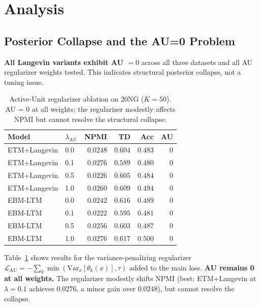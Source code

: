 \documentclass[10pt]{article}
\begin{document}
\section{Analysis}
\label{sec:analysis}

\subsection{Posterior Collapse and the AU=0 Problem}
\label{sec:collapse}

\textbf{All Langevin variants exhibit AU $= 0$} across all three datasets and all
AU regularizer weights tested. This indicates structural posterior collapse, not
a tuning issue.

\begin{table}[t]
\centering
\caption{Active-Unit regularizer ablation on 20NG ($K=50$). AU = 0 at all weights;
the regularizer modestly affects NPMI but cannot resolve the structural collapse.}
\label{tab:au_ablation}
\small
\begin{tabular}{llrrrr}
\hline
\textbf{Model} & \textbf{$\lambda_{\mathrm{AU}}$} &
    \textbf{NPMI} & \textbf{TD} & \textbf{Acc} & \textbf{AU} \\
\hline
ETM+Langevin & 0.0 & $0.0248$ & $0.604$ & $0.483$ & 0 \\
ETM+Langevin & 0.1 & $0.0276$ & $0.589$ & $0.480$ & 0 \\
ETM+Langevin & 0.5 & $0.0226$ & $0.605$ & $0.484$ & 0 \\
ETM+Langevin & 1.0 & $0.0260$ & $0.609$ & $0.494$ & 0 \\
\hline
EBM-LTM      & 0.0 & $0.0242$ & $0.616$ & $0.489$ & 0 \\
EBM-LTM      & 0.1 & $0.0222$ & $0.595$ & $0.481$ & 0 \\
EBM-LTM      & 0.5 & $0.0256$ & $0.603$ & $0.487$ & 0 \\
EBM-LTM      & 1.0 & $0.0276$ & $0.617$ & $0.500$ & 0 \\
\hline
\end{tabular}
\end{table}

Table~\ref{tab:au_ablation} shows results for the variance-penalizing regularizer
$\mathcal{L}_{\mathrm{AU}} = -\sum_k \min(\mathrm{Var}_x[\theta_k(x)], \tau)$
added to the main loss.
\textbf{AU remains 0 at all weights.} The regularizer modestly shifts NPMI
(best: ETM+Langevin at $\lambda=0.1$ achieves $0.0276$, a minor gain over $0.0248$),
but cannot resolve the collapse.
\end{document}
